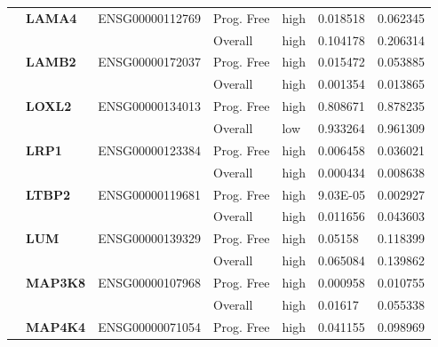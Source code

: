 \begin{spacing}{1}
{\begin{longtable}{|>{\bfseries}p{2cm}|>{\bfseries}p{1.9cm}|p{2.8cm}|p{2cm}|p{2cm}|p{1.5cm}|p{1.5cm}|}
            \hhline{~======}
             & LAMA4    & ENSG00000112769 & Prog. Free & high & 0.018518 & 0.062345                \\
            \hhline{~~~----}
             &          &                 & Overall    & high & 0.104178 & 0.206314                \\
            \hhline{~======}
             & LAMB2    & ENSG00000172037 & Prog. Free & high & 0.015472 & 0.053885                \\
            \hhline{~~~----}
             &          &                 & Overall    & high & 0.001354 & 0.013865                \\
            \hhline{~======}
             & LOXL2    & ENSG00000134013 & Prog. Free & high & 0.808671 & 0.878235                \\
            \hhline{~~~----}
             &          &                 & Overall    & low  & 0.933264 & 0.961309                \\
            \hhline{~======}
             & LRP1     & ENSG00000123384 & Prog. Free & high & 0.006458 & 0.036021                \\
            \hhline{~~~----}
             &          &                 & Overall    & high & 0.000434 & 0.008638                \\
            \hhline{~======}
             & LTBP2    & ENSG00000119681 & Prog. Free & high & 9.03E-05 & 0.002927                \\
            \hhline{~~~----}
             &          &                 & Overall    & high & 0.011656 & 0.043603                \\
            \hhline{~======}
             & LUM      & ENSG00000139329 & Prog. Free & high & 0.05158  & 0.118399                \\
            \hhline{~~~----}
             &          &                 & Overall    & high & 0.065084 & 0.139862                \\
            \hhline{~======}
            \multirow{2}{3cm}{True}
             & MAP3K8   & ENSG00000107968 & Prog. Free & high & 0.000958 & 0.010755                \\
            \hhline{~~~----}
             &          &                 & Overall    & high & 0.01617  & 0.055338                \\
            \hhline{~======}
             & MAP4K4   & ENSG00000071054 & Prog. Free & high & 0.041155 & 0.098969                \\

\end{longtable}}
\end{spacing}
